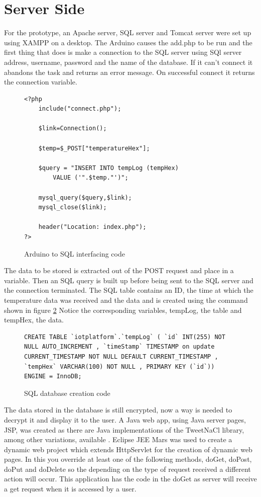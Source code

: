 \section{Server Side}
For the prototype, an Apache server, SQL server and Tomcat server were set up using XAMPP on a desktop. The Arduino causes the add.php to be run and the first thing that does is make a connection to the SQL server using SQl server address, username, password and the name of the database. If it can't connect it abandons the task and returns an error message. On successful connect it returns the connection variable.

\begin{figure}[H]
\begin{lstlisting}[style=PHP]
<?php
   	include("connect.php");
 
   	$link=Connection();
	
	$temp=$_POST["temperatureHex"];
 
	$query = "INSERT INTO tempLog (tempHex) 
		VALUE ('".$temp."')"; 
 
   	mysql_query($query,$link);
   	mysql_close($link);
 
   	header("Location: index.php");
?>
\end{lstlisting}
\caption{Arduino to SQL interfacing code}
\label{snip:php}
\end{figure}

The data to be stored is extracted out of the POST request and place in a variable. Then an SQL query is built up before being sent to the SQL server and the connection terminated. The SQL table contains an ID, the time at which the temperature data was received and the data and is created using the command shown in figure \ref{snip:sql} Notice the corresponding variables, tempLog, the table and tempHex, the data.

\begin{figure}[H]
\begin{lstlisting}[style=SQL]
CREATE TABLE `iotplatform`.`tempLog` ( `id` INT(255) NOT NULL AUTO_INCREMENT , `timeStamp` TIMESTAMP on update CURRENT_TIMESTAMP NOT NULL DEFAULT CURRENT_TIMESTAMP , `tempHex` VARCHAR(100) NOT NULL , PRIMARY KEY (`id`)) ENGINE = InnoDB;
\end{lstlisting}
\caption{SQL database creation code}
\label{snip:sql}
\end{figure}
The data stored in the database is still encrypted, now a way is needed to decrypt it and display it to the user. A Java web app, using Java server pages, JSP, was created as there are Java implementations of the TweetNaCl library, among other variations, available \cite{ian}. Eclipse JEE Mars was used to create a dynamic web project which extends HttpServlet for the creation of dynamic web pages. In this you override at least one of the following methods, doGet, doPost, doPut and doDelete so the depending on the type of request received a different action will occur. This application has the code in the doGet as server will receive a get request when it is accessed by a user.

